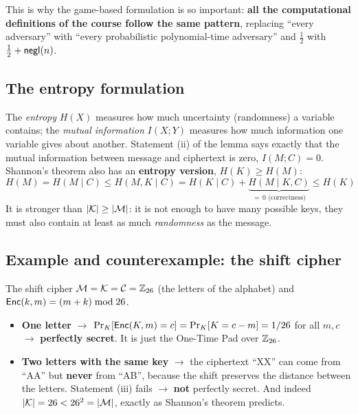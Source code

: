 This is why the game-based formulation is so important: \textbf{all the computational definitions of the course follow the same pattern}, replacing ``every adversary'' with ``every probabilistic polynomial-time adversary'' and $\frac{1}{2}$ with $\frac{1}{2} + \mathsf{negl}(n)$.

\subsection{The entropy formulation}

The \textit{entropy} $H(X)$ measures how much uncertainty (randomness) a variable contains; the \textit{mutual information} $I(X;Y)$ measures how much information one variable gives about another. Statement (ii) of the lemma says exactly that the mutual information between message and ciphertext is zero, $I(M;C) = 0$. Shannon's theorem also has an \textbf{entropy version}, $H(K) \geq H(M)$:
\[
  H(M) = H(M \mid C) \leq H(M, K \mid C) = H(K \mid C) + \underbrace{H(M \mid K, C)}_{=\,0 \text{ (correctness)}} \leq H(K)
\]
It is stronger than $|\mathcal{K}| \geq |\mathcal{M}|$: it is not enough to have many possible keys, they must also contain at least as much \textit{randomness} as the message.

\subsection{Example and counterexample: the shift cipher}

\begin{framedex}{The shift cipher}
  $\mathcal{M} = \mathcal{K} = \mathcal{C} = \mathbb{Z}_{26}$ (the letters of the alphabet) and $\mathsf{Enc}(k, m) = (m + k) \bmod 26$.
  \begin{itemize}
    \item \textbf{One letter} $\to$ $\Pr_K[\mathsf{Enc}(K, m) = c] = \Pr_K[K = c - m] = 1/26$ for all $m, c$ $\to$ \textbf{perfectly secret}. It is just the One-Time Pad over $\mathbb{Z}_{26}$.
    \item \textbf{Two letters with the same key} $\to$ the ciphertext ``XX'' can come from ``AA'' but \textbf{never} from ``AB'', because the shift preserves the distance between the letters. Statement (iii) fails $\to$ \textbf{not} perfectly secret. And indeed $|\mathcal{K}| = 26 < 26^2 = |\mathcal{M}|$, exactly as Shannon's theorem predicts.
  \end{itemize}
\end{framedex}
